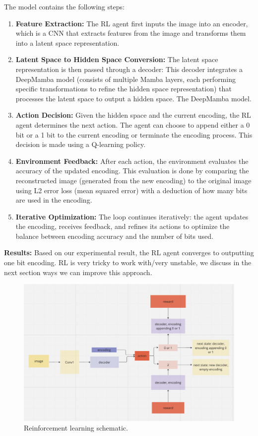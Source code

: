 \documentclass[11pt]{article}
\begin{document}
The model contains the following steps: 
\begin{enumerate}
    \item \textbf{Feature Extraction:} The RL agent first inputs the image into an encoder, which is a CNN  that extracts features from the image and transforms them into a latent space representation. 
    \item \textbf{Latent Space to Hidden Space Conversion:} The latent space representation is then passed through a decoder: This decoder integrates a DeepMamba model (consists of multiple Mamba layers, each performing specific transformations to refine the hidden space representation) that processes the latent space to output a hidden space. The DeepMamba model. 
    \item \textbf{Action Decision:} Given the hidden space and the current encoding, the RL agent determines the next action. The agent can choose to append either a 0 bit or a 1 bit to the current encoding or terminate the encoding process. This decision is made using a Q-learning policy. 
    \item \textbf{Environment Feedback:} After each action, the environment evaluates the accuracy of the updated encoding. This evaluation is done by comparing the reconstructed image (generated from the new encoding) to the original image using L2 error loss (mean squared error) with a deduction of how many bits are used in the encoding. 
    \item \textbf{Iterative Optimization:} The loop continues iteratively: the agent updates the encoding, receives feedback, and refines its actions to optimize the balance between encoding accuracy and the number of bits used.  
\end{enumerate}
 
\textbf{Results:} Based on our experimental result, the RL agent converges to outputting one bit encoding. RL is very tricky to work with/very unstable, we discuss in the next section ways we can improve this approach.

\begin{figure}[hb]
  \centering
  \includegraphics[width=\columnwidth]{diagrams/rl.png}
  \caption{Reinforcement learning schematic.}
  \label{fig:rl}
\end{figure}
\end{document}
